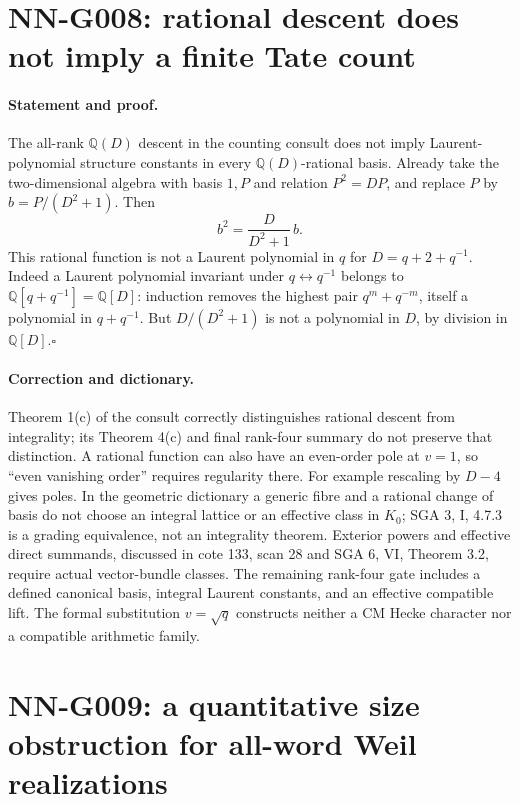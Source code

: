 \section{NN-G008: rational descent does not imply a finite Tate count}
\paragraph{Statement and proof.}
The all-rank $\mathbb Q(D)$ descent in the counting consult does
not imply Laurent-polynomial structure constants in every
$\mathbb Q(D)$-rational basis. Already take the two-dimensional
algebra with basis $1,P$ and relation $P^2=DP$, and replace
$P$ by $b=P/(D^2+1)$. Then
\[
 b^2=\frac{D}{D^2+1}\,b.                            \tag{G008.1}
\]
This rational function is not a Laurent polynomial in $q$ for
$D=q+2+q^{-1}$. Indeed a Laurent polynomial invariant under
$q\leftrightarrow q^{-1}$ belongs to $\mathbb Q[q+q^{-1}]
=\mathbb Q[D]$: induction removes the highest pair
$q^m+q^{-m}$, itself a polynomial in $q+q^{-1}$. But
$D/(D^2+1)$ is not a polynomial in $D$, by division in
$\mathbb Q[D]$.\hfill$\square$

\paragraph{Correction and dictionary.}
Theorem 1(c) of the consult correctly distinguishes rational
descent from integrality; its Theorem 4(c) and final rank-four
summary do not preserve that distinction. A rational function
can also have an even-order pole at $v=1$, so ``even vanishing
order'' requires regularity there. For example rescaling by
$D-4$ gives poles. In the geometric dictionary a generic fibre
and a rational change of basis do not choose an integral lattice
or an effective class in $K_0$; SGA 3, I, 4.7.3 is a grading
equivalence, not an integrality theorem. Exterior powers and
effective direct summands, discussed in cote 133, scan 28 and
SGA 6, VI, Theorem 3.2, require actual vector-bundle classes.
The remaining rank-four gate includes a defined canonical basis,
integral Laurent constants, and an effective compatible lift.
The formal substitution $v=\sqrt q$ constructs neither a CM
Hecke character nor a compatible arithmetic family.



\section{NN-G009: a quantitative size obstruction for all-word Weil realizations}
